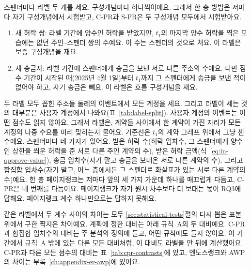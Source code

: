 스펜더마다 라벨 두 개를 세요. 구성개념마다 하나씩이에요. 그래서 한 층 방법은 저마다 자기 구성개념에서 시험받고, \mbox{C-PR}과 \mbox{S-PR}은 두 구성개념 모두에서 시험받아요.
\begin{enumerate}
\item 새 허락 쌍: 라벨 기간에 양수인 허락을 받았지만, $t_1$의 마지막 양수 허락을 찍은 모습에는 없던 주인–스펜더 쌍의 수예요. 이 수는 스펜더의 것으로 쳐요. 이 라벨은 보증 구성개념을 재요.
\item 새 송금자: 라벨 기간에 스펜더에게 송금을 보낸 서로 다른 주소의 수예요. 다만 점수 기간이 시작된 때(2025년 4월 1일)부터 $t_1$까지 그 스펜더에게 송금을 보낸 적이 없어야 하고, 자기 송금은 빼요. 이 라벨은 흐름 구성개념을 재요.
\end{enumerate}
두 라벨 모두 꼽힌 주소들 둘레의 이벤트에서 모든 계정을 세요. 그리고 라벨이 세는 것의 대부분은 사용자 계정에서 나와요(표~\ref{tab:label-split}). 사용자 계정의 이벤트는 어떤 점수도 읽지 않아요. 그래서 라벨은, 계약들 사이에서 한 계약이 가진 자리가 모든 계정의 나중 수요를 미리 맞히는지 물어요. 기준선은 $t_1$의 계약 그래프 위에서 그냥 센 수예요. 스펜더마다 네 가지가 있어요. 받은 허락 수(허락 입차수, 그 스펜더에게 양수인 상한을 씌운 허락을 준 서로 다른 주인 계약의 수), 받은 허락 금액(식~\eqref{eq:in-approve-value}), 송금 입차수(자기 말고 송금을 보내온 서로 다른 계약의 수), 그리고 합집합 입차수(자기 말고, 어느 층에서든 그 스펜더로 화살표가 있는 서로 다른 계약의 수)예요. 한 층 페이지랭크는 저마다 앞의 세 가지 가운데 하나를 매끄럽게 다듬고, \mbox{C-PR}은 네 번째를 다듬어요. 페이지랭크가 자기 원시 차수보다 더 보태는 몫이 RQ3에 답해요. 페이지랭크 계수 하나만으로는 답하지 못해요.

같은 라벨에서 두 계수 사이의 차이는 모두 \ref{sec:statistical-tests}절의 다시 뽑은 표본 위에서 구한 짝지은 차이예요. 계획에 정한 대비는 아래 규칙~A의 두 대비예요. \mbox{C-PR}과 합집합 입차수의 대비는 주 분석의 정의에 들고, 어떤 규칙에도 들지 않아요. 이 기간에서 규칙~A 밖에 있는 다른 모든 대비처럼, 이 대비도 라벨을 안 뒤에 계산했어요. \mbox{C-PR}과 다른 모든 점수의 대비는 표~\ref{tab:cpr-contrasts}에 있고, 엔도스랭크와 AWP의 차이는 부록~\ref{ch:appendix-er-awp}에 있어요.

